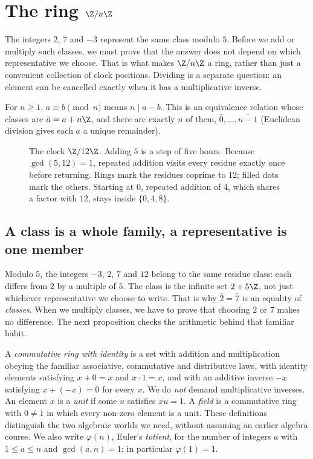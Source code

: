 \section{The ring \texorpdfstring{$\Z/n\Z$}{Z/nZ}}

The integers $2$, $7$ and $-3$ represent the same class modulo $5$. Before we add or multiply such classes, we must prove that the answer does not depend on which representative we choose. That is what makes $\Z/n\Z$ a ring, rather than just a convenient collection of clock positions. Dividing is a separate question: an element can be cancelled exactly when it has a multiplicative inverse.

For $n\ge1$, $a\equiv b\pmod n$ means $n\mid a-b$. This is an equivalence relation whose classes are $\bar a=a+n\Z$, and there are exactly $n$ of them, $\bar0,\dots,\overline{n-1}$ (Euclidean division gives each $a$ a unique remainder).

\begin{figure}[ht]
\centering
{}
\caption{The clock $\Z/12\Z$. Adding $5$ is a step of five hours. Because $\gcd(5,12)=1$, repeated addition visits every residue exactly once before returning. Rings mark the residues coprime to $12$; filled dots mark the others. Starting at $0$, repeated addition of $4$, which shares a factor with $12$, stays inside $\{0,4,8\}$.}
\label{fig:clock}
\end{figure}

\subsection*{A class is a whole family, a representative is one member}
Modulo $5$, the integers $-3$, $2$, $7$ and $12$ belong to the same residue class: each differs from $2$ by a multiple of $5$. The class is the infinite set $2+5\Z$, not just whichever representative we choose to write. That is why $\bar2=\bar7$ is an equality of \emph{classes}. When we multiply classes, we have to prove that choosing $2$ or $7$ makes no difference. The next proposition checks the arithmetic behind that familiar habit.

A \emph{commutative ring with identity} is a set with addition and multiplication obeying the familiar associative, commutative and distributive laws, with identity elements satisfying $x+0=x$ and $x\cdot1=x$, and with an additive inverse $-x$ satisfying $x+(-x)=0$ for every $x$. We do \emph{not} demand multiplicative inverses. An element $x$ is a \emph{unit} if some $u$ satisfies $xu=1$. A \emph{field} is a commutative ring with $0\ne1$ in which every non-zero element is a unit. These definitions distinguish the two algebraic worlds we need, without assuming an earlier algebra course. We also write $\varphi(n)$, Euler's \emph{totient}, for the number of integers $a$ with $1\le a\le n$ and $\gcd(a,n)=1$; in particular $\varphi(1)=1$.\label{sym:phi}

